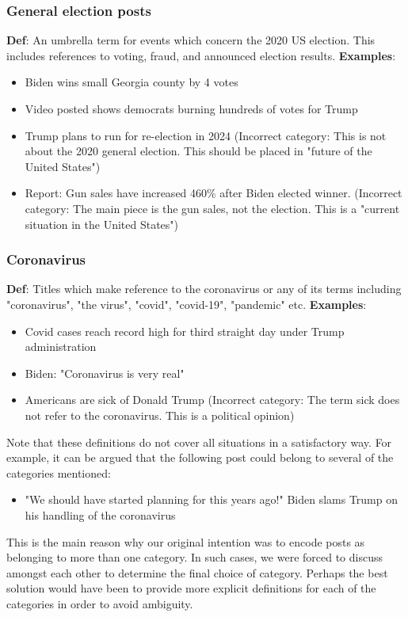 \documentclass[11pt]{article}
\begin{document}
\subsubsection*{General election posts}
\textbf{Def}: An umbrella term for events which concern the 2020 US election. This includes references to voting, fraud, and announced election results.
\newline
\textbf{Examples}: 
\begin{itemize}
    \item Biden wins small Georgia county by 4 votes
    \item Video posted shows democrats burning hundreds of votes for Trump
    \item Trump plans to run for re-election in 2024 (Incorrect category: This is not about the 2020 general election. This should be placed in "future of the United States") 
    \item Report: Gun sales have increased 460\% after Biden elected winner. (Incorrect category: The main piece is the gun sales, not the election. This is a "current situation in the United States")
\end{itemize}
\subsubsection*{Coronavirus}
\textbf{Def}: Titles which make reference to the coronavirus or any of its terms including "coronavirus", "the virus", "covid", "covid-19", "pandemic" etc. 
\newline
\textbf{Examples}: 
\begin{itemize}
    \item Covid cases reach record high for third straight day under Trump administration
    \item Biden: "Coronavirus is very real"
    \item Americans are sick of Donald Trump (Incorrect category: The term sick does not refer to the coronavirus. This is a political opinion)
\end{itemize}
\par
Note that these definitions do not cover all situations in a satisfactory way. For example, it can be argued that the following post could belong to several of the categories mentioned:
\begin{itemize}
    \item "We should have started planning for this years ago!" Biden slams Trump on his handling of the coronavirus
\end{itemize}
This is the main reason why our original intention was to encode posts as belonging to more than one category. In such cases, we were forced to discuss amongst each other to determine the final choice of category. Perhaps the best solution would have been to provide more explicit definitions for each of the categories in order to avoid ambiguity.
\end{document}
